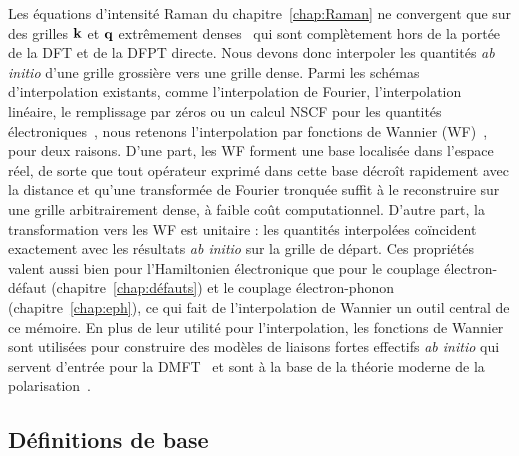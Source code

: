 Les équations d'intensité Raman du chapitre~\ref{chap:Raman} ne convergent que sur des grilles $\mathbf{k}$ et $\mathbf{q}$ extrêmement denses~\cite{venezuelaTheoryDoubleresonantRaman2011,gilletFirstprinciplesStudyExcitonic2013a} qui sont complètement hors de la portée de la DFT et de la DFPT directe. Nous devons donc interpoler les quantités \textit{ab initio} d'une grille grossière vers une grille dense. Parmi les schémas d'interpolation existants, comme l'interpolation de Fourier, l'interpolation linéaire, le remplissage par zéros ou un calcul NSCF pour les quantités électroniques~\cite{madsenBoltzTraP2ProgramInterpolating2018,bruninPhononlimitedElectronMobility2020,liElectricalTransportLimited2015}, nous retenons l'interpolation par fonctions de Wannier (WF)~\cite{ponceEPWElectronphononCoupling2016}, pour deux raisons. D'une part, les WF forment une base localisée dans l'espace réel, de sorte que tout opérateur exprimé dans cette base décroît rapidement avec la distance et qu'une transformée de Fourier tronquée suffit à le reconstruire sur une grille arbitrairement dense, à faible coût computationnel. D'autre part, la transformation vers les WF est unitaire : les quantités interpolées coïncident exactement avec les résultats \textit{ab initio} sur la grille de départ. Ces propriétés valent aussi bien pour l'Hamiltonien électronique que pour le couplage électron-défaut (chapitre~\ref{chap:défauts}) et le couplage électron-phonon (chapitre~\ref{chap:eph}), ce qui fait de l'interpolation de Wannier un outil central de ce mémoire. En plus de leur utilité pour l'interpolation, les fonctions de Wannier sont utilisées pour construire des modèles de liaisons fortes effectifs \textit{ab initio} qui servent d'entrée pour la DMFT~\cite{lechermannDynamicalMeanfieldTheory2006} et sont à la base de la théorie moderne de la polarisation~\cite{king-smithTheoryPolarizationCrystalline1993,restaMacroscopicPolarizationCrystalline1994}.

\subsection{Définitions de base}

